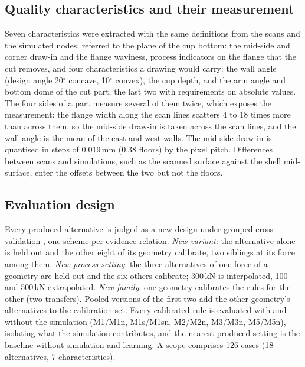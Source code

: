 \documentclass[pdflatex,sn-basic,lineno]{sn-jnl}
\begin{document}
\subsection{Quality characteristics and their measurement}\label{sec:qcs}

Seven characteristics were extracted with the same definitions from the scans and the simulated nodes, referred to the plane of the cup bottom: the mid-side and corner draw-in and the flange waviness, process indicators on the flange that the cut removes, and four characteristics a drawing would carry: the wall angle (design angle 20$^\circ$ concave, 10$^\circ$ convex), the cup depth, and the arm angle and bottom dome of the cut part, the last two with requirements on absolute values. The four sides of a part measure several of them twice, which exposes the measurement: the flange width along the scan lines scatters 4 to 18 times more than across them, so the mid-side draw-in is taken across the scan lines, and the wall angle is the mean of the east and west walls. The mid-side draw-in is quantised in steps of 0.019\,mm (0.38 floors) by the pixel pitch. Differences between scans and simulations, such as the scanned surface against the shell mid-surface, enter the offsets between the two but not the floors.

\subsection{Evaluation design}\label{sec:evaldesign}

Every produced alternative is judged as a new design under grouped cross-validation \citep{roberts2017cross}, one scheme per evidence relation. \emph{New variant}: the alternative alone is held out and the other eight of its geometry calibrate, two siblings at its force among them. \emph{New process setting}: the three alternatives of one force of a geometry are held out and the six others calibrate; 300\,kN is interpolated, 100 and 500\,kN extrapolated. \emph{New family}: one geometry calibrates the rules for the other (two transfers). Pooled versions of the first two add the other geometry's alternatives to the calibration set. Every calibrated rule is evaluated with and without the simulation (M1/M1n, M1s/M1sn, M2/M2n, M3/M3n, M5/M5n), isolating what the simulation contributes, and the nearest produced setting is the baseline without simulation and learning. A scope comprises 126 cases (18 alternatives, 7 characteristics).
\end{document}
